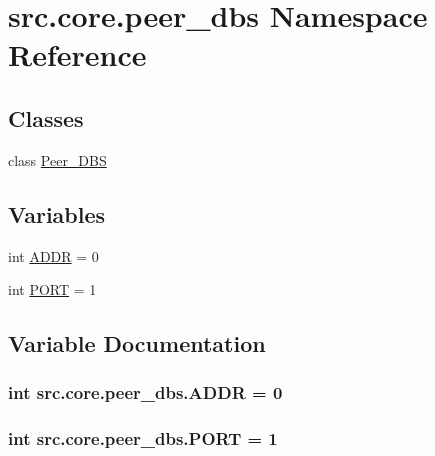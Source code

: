 \hypertarget{namespacesrc_1_1core_1_1peer__dbs}{}\section{src.\+core.\+peer\+\_\+dbs Namespace Reference}
\label{namespacesrc_1_1core_1_1peer__dbs}
\subsection*{Classes}
\begin{DoxyCompactItemize}
\item 
class \hyperlink{classsrc_1_1core_1_1peer__dbs_1_1Peer__DBS}{Peer\+\_\+\+D\+B\+S}
\end{DoxyCompactItemize}
\subsection*{Variables}
\begin{DoxyCompactItemize}
\item 
int \hyperlink{namespacesrc_1_1core_1_1peer__dbs_aaddd55860ffd04366820945e8c34a934}{A\+D\+D\+R} = 0
\item 
int \hyperlink{namespacesrc_1_1core_1_1peer__dbs_a42fed6831b468d0e70550f7ea90a2adc}{P\+O\+R\+T} = 1
\end{DoxyCompactItemize}


\subsection{Variable Documentation}
\hypertarget{namespacesrc_1_1core_1_1peer__dbs_aaddd55860ffd04366820945e8c34a934}{}
\subsubsection[{A\+D\+D\+R}]{\setlength{\rightskip}{0pt plus 5cm}int src.\+core.\+peer\+\_\+dbs.\+A\+D\+D\+R = 0}\label{namespacesrc_1_1core_1_1peer__dbs_aaddd55860ffd04366820945e8c34a934}
\hypertarget{namespacesrc_1_1core_1_1peer__dbs_a42fed6831b468d0e70550f7ea90a2adc}{}
\subsubsection[{P\+O\+R\+T}]{\setlength{\rightskip}{0pt plus 5cm}int src.\+core.\+peer\+\_\+dbs.\+P\+O\+R\+T = 1}\label{namespacesrc_1_1core_1_1peer__dbs_a42fed6831b468d0e70550f7ea90a2adc}
